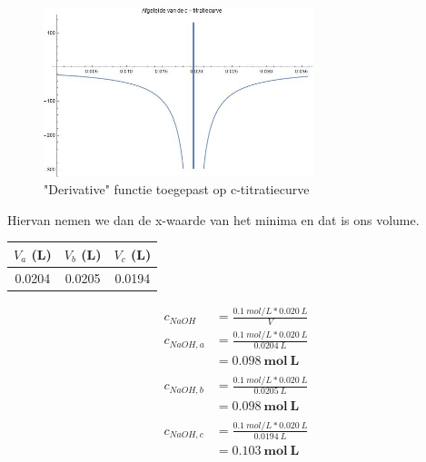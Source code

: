 \documentclass[10pt,twoside]{report}
\newcommand{\pbr}{\hfill\break\hfill\break}
\begin{document}
\begin{figure}[H]
    \centering
    \includegraphics[width=0.7\textwidth]{c_derivative.jpg}
    \caption{"Derivative" functie toegepast op c-titratiecurve}
\end{figure}
Hiervan nemen we dan de x-waarde van het minima en dat is ons volume.\pbr
\begin{tabular}{|c|c|c|}
    \hline
    $V_{a}$ (L) & $V_{b}$ (L) & $V_{c}$ (L) \\\hline
    0.0204 & 0.0205 & 0.0194 \\\hline
\end{tabular}

\begin{equation*}
    \begin{split}
        c_{NaOH} &= \frac{0.1\ mol/L * 0.020\ L}{V}\\
        c_{NaOH,a} &= \frac{0.1\ mol/L * 0.020\ L}{0.0204\ L}\\
            &= \mathbf{0.098\ mol\ L}\\\\
        c_{NaOH,b} &= \frac{0.1\ mol/L * 0.020\ L}{0.0205\ L}\\
            &= \mathbf{0.098\ mol\ L}\\\\
        c_{NaOH,c} &= \frac{0.1\ mol/L * 0.020\ L}{0.0194\ L}\\
            &= \mathbf{0.103\ mol\ L}\\
    \end{split}
\end{equation*}
\end{document}
